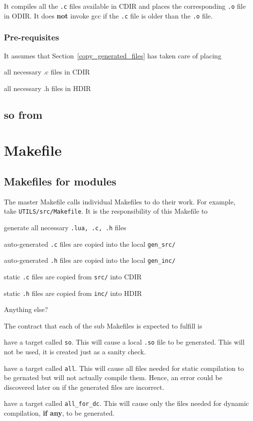 It compiles all the {\tt .c} files available in CDIR and places 
the corresponding {\tt .o} file in ODIR. It does {\bf not} invoke gcc if the {\tt.c}
file is older than the {\tt .o} file. 


\subsubsection{Pre-requisites}
It assumes that Section~\ref{copy_generated_files} has taken care of placing
\be
\item all necessary .c files in CDIR
\item all necessary .h files in HDIR
\ee

\subsection{so from}
\label{so_from_o}
\TBC

\section{Makefile}

\subsection{Makefiles for modules}
The master Makefile calls individual Makefiles to do their work. For example,
take \verb+UTILS/src/Makefile+. It is the responsibility of this Makefile to
\be
\item generate all necessary {\tt .lua, .c, .h} files
\item auto-generated {\tt .c} files are copied into the local \verb+gen_src/+ 
\item auto-generated {\tt .h} files are copied into the local \verb+gen_inc/+ 

\item static {\tt .c} files are copied from {\tt src/} into CDIR
\item static {\tt .h} files are copied from {\tt inc/} into HDIR
\item Anything else? \TBC
\ee

The contract that each of the sub Makefiles is expected to fulfill is
\be
\item 
have a target called {\tt so}. This will cause a local \verb+.so+ file 
to be generated. This will not be used, it is created just as a 
sanity check.
\item have a target called {\tt all}. This will cause all files needed for
static compilation to be gernated but will not actually compile them. Hence, an
error could be discovered later on if the generated files are incorrect.
\item have a target called {\tt all\_for\_dc}. This will cause only the files needed for
dynamic compilation, {\bf if any}, to be generated.

